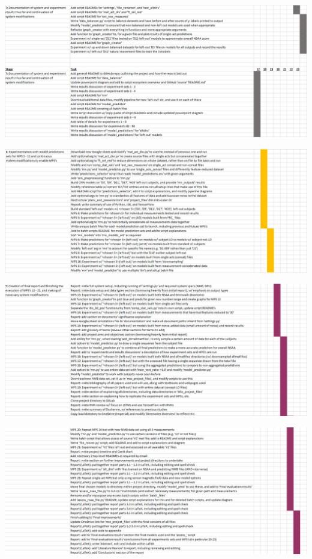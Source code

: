 \documentclass[12pt,twoside]{report}
\begin{document}
\begin{center}
\includegraphics[scale=0.4]{project_figures/fig12_6}
\end{center}

\begin{center}
\includegraphics[scale=0.4]{project_figures/fig12_7}
\end{center}

\begin{center}
\includegraphics[scale=0.4]{project_figures/fig12_8}
\end{center}

\begin{center}
\includegraphics[scale=0.4]{project_figures/fig12_9}
\end{center}
\end{document}
